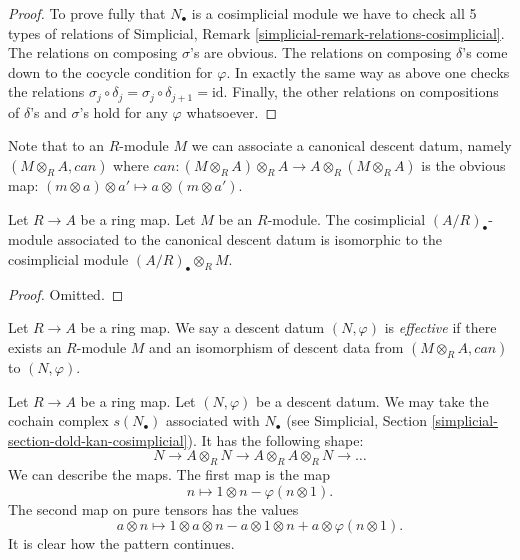 \begin{proof}
\medskip\noindent
To prove fully that $N_\bullet$ is a cosimplicial module we have to check
all 5 types of relations of
Simplicial, Remark \ref{simplicial-remark-relations-cosimplicial}.
The relations on composing $\sigma$'s are obvious.
The relations on composing $\delta$'s come down to the
cocycle condition for $\varphi$.
In exactly the same way as above one checks the relations
$\sigma_j \circ \delta_j = \sigma_j \circ \delta_{j + 1} = \text{id}$.
Finally, the other relations on compositions of $\delta$'s and $\sigma$'s
hold for any $\varphi$ whatsoever.
\end{proof}

\noindent
Note that to an $R$-module $M$ we can associate a canonical
descent datum, namely $(M \otimes_R A, can)$ where
$can : (M \otimes_R A) \otimes_R A \to A \otimes_R (M \otimes_R A)$
is the obvious map:
$(m \otimes a) \otimes a' \mapsto a \otimes (m \otimes a')$.

\begin{lemma}
\label{lemma-canonical-descent-datum-cosimplicial}
Let $R \to A$ be a ring map.
Let $M$ be an $R$-module. The cosimplicial
$(A/R)_\bullet$-module associated to the canonical descent
datum is isomorphic to the cosimplicial module $(A/R)_\bullet \otimes_R M$.
\end{lemma}

\begin{proof}
Omitted.
\end{proof}

\begin{definition}
\label{definition-descent-datum-effective-module}
Let $R \to A$ be a ring map.
We say a descent datum $(N, \varphi)$ is {\it effective}
if there exists an $R$-module $M$ and an isomorphism
of descent data from $(M \otimes_R A, can)$ to
$(N, \varphi)$.
\end{definition}

\noindent
Let $R \to A$ be a ring map.
Let $(N, \varphi)$ be a descent datum.
We may take the cochain complex $s(N_\bullet)$ associated
with $N_\bullet$ (see
Simplicial, Section \ref{simplicial-section-dold-kan-cosimplicial}).
It has the following shape:
$$
N \to A \otimes_R N \to A \otimes_R A \otimes_R N \to \ldots
$$
We can describe the maps.
The first map is the map
$$
n \longmapsto 1 \otimes n - \varphi(n \otimes 1).
$$
The second map on pure tensors has the values
$$
a \otimes n \longmapsto 1 \otimes a \otimes n
- a \otimes 1 \otimes n + a \otimes \varphi(n \otimes 1).
$$
It is clear how the pattern continues.

